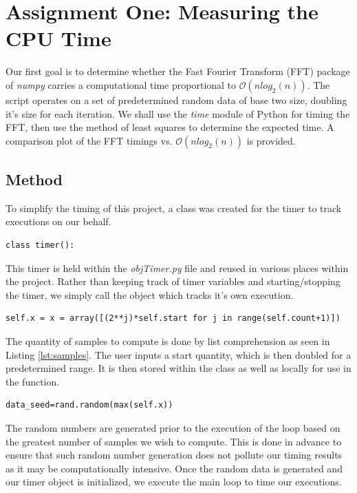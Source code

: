 
\section{Assignment One: Measuring the CPU Time} %
\label{sec:measuring_the_cpu_time}
Our first goal is to determine whether the Fast Fourier Transform (FFT) package of \emph{numpy} carries a computational time proportional to $\mathcal{O}(n log_2(n))$. The script operates on a set of predetermined random data of base two size, doubling it's size for each iteration. We shall use the \emph{time} module of Python for timing the FFT, then use the method of least squares to determine the expected time. A comparison plot of the FFT timings vs. $\mathcal{O}(n log_2(n))$ is provided.

\subsection{Method} %
\label{sub:methoda}
To simplify the timing of this project, a class was created for the timer to track executions on our behalf.
\begin{lstlisting}[caption={Timer Class},label=lst:timeclass,firstnumber=1]
    class timer():
\end{lstlisting}
This timer is held within the \emph{objTimer.py} file and reused in various places within the project. Rather than keeping track of timer variables and starting/stopping the timer, we simply call the object which tracks it's own execution.
\begin{lstlisting}[caption={Quantity of Samples to Compute},label=lst:samples,firstnumber=32]
    self.x = x = array([(2**j)*self.start for j in range(self.count+1)])
\end{lstlisting}
The quantity of samples to compute is done by list comprehension as seen in Listing \ref{lst:samples}. The user inputs a start quantity, which is then doubled for a predetermined range. It is then stored within the class as well as locally for use in the function.
\begin{lstlisting}[caption={Random Number Generation},label=lst:rand,firstnumber=36]
    data_seed=rand.random(max(self.x))
\end{lstlisting}
The random numbers are generated prior to the execution of the loop based on the greatest number of samples we wish to compute. This is done in advance to ensure that such random number generation does not pollute our timing results as it may be computationally intensive. Once the random data is generated and our timer object is initialized, we execute the main loop to time our executions.

